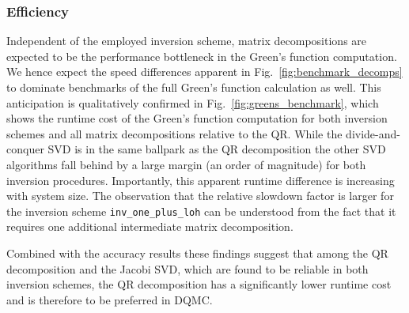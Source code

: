 \documentclass[submission, Phys]{SciPost}
\begin{document}
\subsubsection{Efficiency}

Independent of the employed inversion scheme, matrix decompositions are expected to be the performance bottleneck in the Green's function computation. We hence expect the speed differences apparent in Fig.~\ref{fig:benchmark_decomps} to dominate benchmarks of the full Green's function calculation as well. This anticipation is qualitatively confirmed in Fig.~\ref{fig:greens_benchmark}, which shows the runtime cost of the Green's function computation for both inversion schemes and all matrix decompositions relative to the QR. While the divide-and-conquer SVD is in the same ballpark as the QR decomposition the other SVD algorithms fall behind by a large margin (an order of magnitude) for both inversion procedures. Importantly, this apparent runtime difference is increasing with system size. The observation that the relative slowdown factor is larger for the inversion scheme \texttt{inv\_one\_plus\_loh} can be understood from the fact that it requires one additional intermediate matrix decomposition.

Combined with the accuracy results these findings suggest that among the QR decomposition and the Jacobi SVD, which are found to be reliable in both inversion schemes, the QR decomposition has a significantly lower runtime cost and is therefore to be preferred in DQMC.
\end{document}
